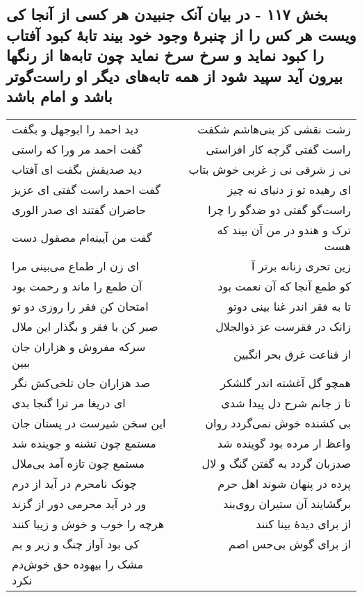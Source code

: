 \begin{center}
\section*{بخش ۱۱۷ - در بیان آنک جنبیدن هر کسی از آنجا کی ویست هر کس را از چنبرهٔ وجود خود بیند تابهٔ کبود آفتاب را کبود نماید و سرخ سرخ نماید چون تابه‌ها از رنگها بیرون آید سپید شود از همه تابه‌های دیگر او راست‌گوتر باشد و امام باشد}
\label{sec:sh117}
\begin{longtable}{l p{0.5cm} r}
دید احمد را ابوجهل و بگفت
&&
زشت نقشی کز بنی‌هاشم شکفت
\\
گفت احمد مر ورا که راستی
&&
راست گفتی گرچه کار افزاستی
\\
دید صدیقش بگفت ای آفتاب
&&
نی ز شرقی نی ز غربی خوش بتاب
\\
گفت احمد راست گفتی ای عزیز
&&
ای رهیده تو ز دنیای نه چیز
\\
حاضران گفتند ای صدر الوری
&&
راست‌گو گفتی دو ضدگو را چرا
\\
گفت من آیینه‌ام مصقول دست
&&
ترک و هندو در من آن بیند که هست
\\
ای زن ار طماع می‌بینی مرا
&&
زین تحری زنانه برتر آ
\\
آن طمع را ماند و رحمت بود
&&
کو طمع آنجا که آن نعمت بود
\\
امتحان کن فقر را روزی دو تو
&&
تا به فقر اندر غنا بینی دوتو
\\
صبر کن با فقر و بگذار این ملال
&&
زانک در فقرست عز ذوالجلال
\\
سرکه مفروش و هزاران جان ببین
&&
از قناعت غرق بحر انگبین
\\
صد هزاران جان تلخی‌کش نگر
&&
همچو گل آغشته اندر گلشکر
\\
ای دریغا مر ترا گنجا بدی
&&
تا ز جانم شرح دل پیدا شدی
\\
این سخن شیرست در پستان جان
&&
بی کشنده خوش نمی‌گردد روان
\\
مستمع چون تشنه و جوینده شد
&&
واعظ ار مرده بود گوینده شد
\\
مستمع چون تازه آمد بی‌ملال
&&
صدزبان گردد به گفتن گنگ و لال
\\
چونک نامحرم در آید از درم
&&
پرده در پنهان شوند اهل حرم
\\
ور در آید محرمی دور از گزند
&&
برگشایند آن ستیران روی‌بند
\\
هرچه را خوب و خوش و زیبا کنند
&&
از برای دیدهٔ بینا کنند
\\
کی بود آواز چنگ و زیر و بم
&&
از برای گوش بی‌حس اصم
\\
مشک را بیهوده حق خوش‌دم نکرد

\end{longtable}
\end{center}
